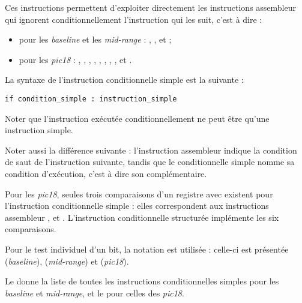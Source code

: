 Ces instructions permettent d'exploiter directement les instructions assembleur qui ignorent conditionnellement l'instruction qui les suit, c'est à dire :
\begin{itemize}
\item pour les \emph{baseline} et les \emph{mid-range} : , ,  et  ;
\item pour les \emph{pic18} : , , , , , , , ,  et .
\end{itemize}

La syntaxe de l'instruction conditionnelle simple est la suivante :

\begin{lstlisting}[language=piccolo]
if condition_simple : instruction_simple
\end{lstlisting}

Noter que l'instruction exécutée conditionnellement ne peut être qu'une instruction simple.

Noter aussi la différence suivante : l'instruction assembleur indique la condition de saut de l'instruction suivante, tandis que le conditionnelle simple nomme sa condition d'exécution, c'est à dire son complémentaire.

Pour les \emph{pic18}, seules trois comparaisons d'un registre avec  existent pour l'instruction conditionnelle simple : elles correspondent aux instructions assembleur ,  et . L'instruction conditionnelle structurée implémente les six comparaisons.

Pour le test individuel d'un bit, la notation  est utilisée : celle-ci est présentée  (\emph{baseline}),  (\emph{mid-range}) et  (\emph{pic18}).

Le  donne la liste de toutes les instructions conditionnelles simples pour les \emph{baseline} et \emph{mid-range}, et le  pour celles des \emph{pic18}.

